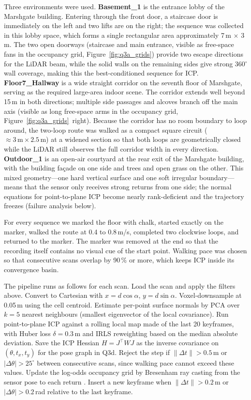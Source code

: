 \documentclass[twocolumn,10pt,a4paper]{article}
\begin{document}
Three environments were used.
\textbf{Basement\_1} is the entrance lobby of the Marshgate building.
Entering through the front door, a staircase door is immediately on
the left and two lifts are on the right; the sequence was collected
in this lobby space, which forms a single rectangular area
approximately 7\,m $\times$ 3\,m. The two open doorways (staircase
and main entrance, visible as free-space fans in the occupancy grid,
Figure~\ref{fig:q3a_grids}) provide two escape directions for the
LiDAR beam, while the solid walls on the remaining sides give
strong 360$^{\circ}$ wall coverage, making this the best-conditioned
sequence for ICP.
\textbf{Floor7\_Hallway} is a wide straight corridor on the seventh
floor of Marshgate, serving as the required large-area indoor scene.
The corridor extends well beyond 15\,m in both directions; multiple
side passages and alcoves branch off the main axis (visible as
long free-space arms in the occupancy grid,
Figure~\ref{fig:q3a_grids}~right). Because the corridor has no room
boundary to loop around, the two-loop route was walked as a compact
square circuit (${\approx}3\,\text{m} \times 2.5\,\text{m}$) at a
widened section so that both loops are geometrically closed while the
LiDAR still observes the full corridor width in every direction.
\textbf{Outdoor\_1} is an open-air courtyard at the rear exit of the
Marshgate building, with the building fa\c{c}ade on one side and
trees and open grass on the other. This mixed geometry---one hard
vertical surface and one soft irregular boundary---means that the
sensor only receives strong returns from one side; the normal
equations for point-to-plane ICP become nearly rank-deficient and
the trajectory freezes (failure analysis below).

For every sequence we marked the floor with chalk, started exactly
on the marker, walked the route at 0.4 to 0.8\,m/s, completed two
clockwise loops, and returned to the marker. The marker was removed
at the end so that the recording itself contains no visual cue of
the start point. Walking pace was chosen so that consecutive scans
overlap by 90\,\% or more, which keeps ICP inside its convergence
basin.

The pipeline runs as follows for each scan. Load the scan and apply
the filters above. Convert to Cartesian with $x = d\cos\alpha$,
$y = d\sin\alpha$. Voxel-downsample at 0.05\,m using the cell
centroid. Estimate per-point surface normals by PCA over $k = 5$
nearest neighbours (smallest eigenvector of the local covariance).
Run point-to-plane ICP  against a rolling local
map made of the last 20 keyframes, with Huber loss $\delta = 0.3$\,m
and IRLS reweighting based on the median absolute deviation. Save the
ICP Hessian $H = J^\top W J$ as the inverse covariance on
$(\theta, t_x, t_y)$ for the pose graph in Q3d. Reject the step if
$\|\Delta t\| > 0.5$\,m or $|\Delta\theta| > 25^{\circ}$ between
consecutive scans, since walking pace cannot exceed these values.
Update the log-odds occupancy grid by Bresenham ray casting from the
sensor pose to each return . Insert a new
keyframe when $\|\Delta t\| > 0.2$\,m or $|\Delta\theta| > 0.2$\,rad
relative to the last keyframe.
\end{document}
